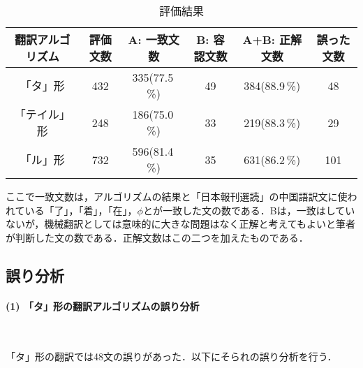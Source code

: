 \begin{table}[htbp]
 \label{HYO5}
 \caption{評価結果}
 \begin{center}
 \def\arraystretch{}
 \begin{tabular}{|c|c|c|c|c|c|} \hline
  翻訳アルゴリズム & 評価文数 & A: 一致文数   & B: 容認文数 & A+B: 正解文数 & 誤った文数 \\ \hline\hline
「タ」形           & 432      & 335(77.5\,\%) & 49          & 384(88.9\,\%) & 48         \\ \hline
「テイル」形       & 248      & 186(75.0\,\%) & 33          & 219(88.3\,\%) & 29         \\ \hline
「ル」形           & 732      & 596(81.4\,\%) & 35          & 631(86.2\,\%) & 101        \\ \hline
 \end{tabular}
 \end{center}
\end{table}

ここで一致文数は，アルゴリズムの結果と「日本報刊選読」の中国語訳文に使われている「了」，「着」，「在」，$\phi$とが一致した文の数である．Bは，一致はしていないが，機械翻訳としては意味的に大きな問題はなく正解と考えてもよいと筆者が判断した文の数である．正解文数はこの二つを加えたものである．


\subsection{誤り分析}

\paragraph{(1) 「タ」形の翻訳アルゴリズムの誤り分析}　

「タ」形の翻訳では48文の誤りがあった．以下にそられの誤り分析を行う．

